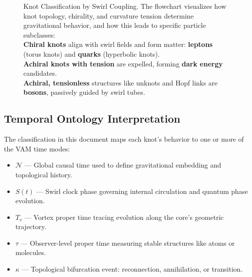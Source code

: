 \begin{figure}[H]
{
    }
    \caption{Knot Classification by Swirl Coupling.
        The flowchart visualizes how knot topology, chirality, and curvature tension determine gravitational behavior, and how this leads to specific particle subclasses:
            \\ \textbf{Chiral knots} align with swirl fields and form matter: \textbf{leptons} (torus knots) and \textbf{quarks} (hyperbolic knots).
            \\ \textbf{Achiral knots with tension} are expelled, forming \textbf{dark energy} candidates.
            \\ \textbf{Achiral, tensionless} structures like unknots and Hopf links are \textbf{bosons}, passively guided by swirl tubes.
    }
\end{figure}

\subsection*{Temporal Ontology Interpretation}

The classification in this document maps each knot's behavior to one or more of the VAM time modes:

\begin{itemize}
    \item $\mathcal{N}$ — Global causal time used to define gravitational embedding and topological history.
    \item $S(t)$ — Swirl clock phase governing internal circulation and quantum phase evolution.
    \item $T_v$ — Vortex proper time tracing evolution along the core's geometric trajectory.
    \item $\tau$ — Observer-level proper time measuring stable structures like atoms or molecules.
    \item $\kappa$ — Topological bifurcation event: reconnection, annihilation, or transition.
\end{itemize}

